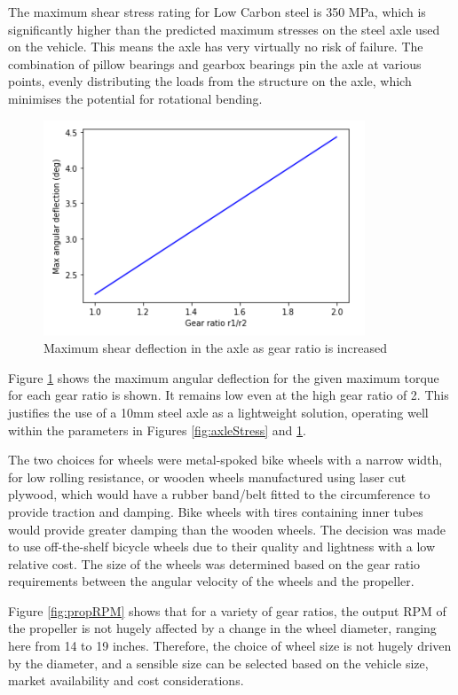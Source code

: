 The maximum shear stress rating for Low Carbon steel is 350 MPa, which is significantly higher than the predicted maximum stresses on the steel axle used on the vehicle. This means the axle has very virtually no risk of failure. The combination of pillow bearings and gearbox bearings pin the axle at various points, evenly distributing the loads from the structure on the axle, which minimises the potential for rotational bending.

\begin{figure}[!htbp]
    \centering
    \includegraphics{images/part9/axleDeflection.png}
    \caption{Maximum shear deflection in the axle as gear ratio is increased}
    \label{fig:axleDeflection}
\end{figure}

Figure \ref{fig:axleDeflection} shows the maximum angular deflection for the given maximum torque for each gear ratio is shown. It remains low even at the high gear ratio of 2. This justifies the use of a 10mm steel axle as a lightweight solution, operating well within the parameters in Figures \ref{fig:axleStress} and \ref{fig:axleDeflection}.

The two choices for wheels were metal-spoked bike wheels with a narrow width, for low rolling resistance, or wooden wheels manufactured using laser cut plywood, which would have a rubber band/belt fitted to the circumference to provide traction and damping. Bike wheels with tires containing inner tubes would provide greater damping than the wooden wheels. The decision was made to use off-the-shelf bicycle wheels due to their quality and lightness with a low relative cost. The size of the wheels was determined based on the gear ratio requirements between the angular velocity of the wheels and the propeller.


Figure \ref{fig:propRPM} shows that for a variety of gear ratios, the output RPM of the propeller is not hugely affected by a change in the wheel diameter, ranging here from 14 to 19 inches. Therefore, the choice of wheel size is not hugely driven by the diameter, and a sensible size can be selected based on the vehicle size, market availability and cost considerations.

